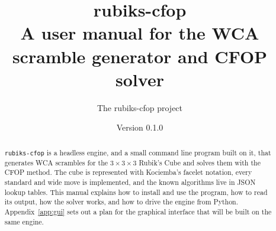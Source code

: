 \documentclass[11pt,a4paper]{article}
\title{\textbf{rubiks-cfop}\\[0.3em]
  \large A user manual for the WCA scramble generator and CFOP solver}
\author{The rubiks-cfop project}
\date{Version 0.1.0}
\begin{document}
\maketitle

\begin{abstract}
\noindent
\texttt{rubiks-cfop} is a headless engine, and a small command line program built
on it, that generates WCA scrambles for the $3\times3\times3$ Rubik's Cube and
solves them with the CFOP method.  The cube is represented with Kociemba's facelet
notation, every standard and wide move is implemented, and the known algorithms
live in JSON lookup tables.  This manual explains how to install and use the
program, how to read its output, how the solver works, and how to drive the engine
from Python.  Appendix~\ref{app:gui} sets out a plan for the graphical interface
that will be built on the same engine.
\end{abstract}

\tableofcontents
\clearpage












\appendix

\end{document}
